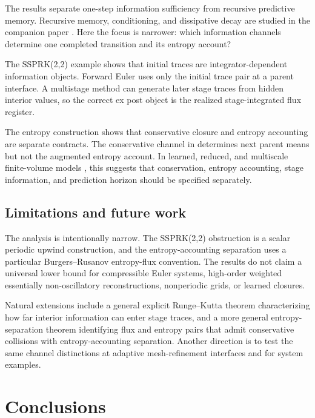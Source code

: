 \documentclass[a4paper,fleqn, sort&compress]{cas-sc}
\theoremstyle{remark}
\theoremstyle{definition}
\begin{document}
The results separate one-step information sufficiency from recursive
predictive memory.  Recursive memory, conditioning, and dissipative decay are
studied in the companion paper \cite{PolemitisChristakisDrikakis2026FVerasure}.
Here the focus is narrower: which information channels determine one
completed transition and its entropy account?

The SSPRK(2,2) example shows that initial traces are integrator-dependent
information objects.  Forward Euler uses only the initial trace pair at a
parent interface.  A multistage method can generate later stage traces from
hidden interior values, so the correct ex post object is the realized
stage-integrated flux register.

The entropy construction shows that conservative closure and entropy
accounting are separate contracts.  The conservative channel in
 determines next parent means but not the augmented
entropy account.  In learned, reduced, and multiscale finite-volume models
\cite{BarSinai:2019datadriven,KochkovEtAl2021,AgdesteinSanderse2025,
SanderseEtAl2025}, this suggests that conservation, entropy accounting,
stage information, and prediction horizon should be specified separately.

\subsection{Limitations and future work}
\label{sec:limitations}

The analysis is intentionally narrow.  The SSPRK(2,2) obstruction is a scalar
periodic upwind construction, and the entropy-accounting separation uses a
particular Burgers--Rusanov entropy-flux convention.  The results do not
claim a universal lower bound for compressible Euler systems, high-order
weighted essentially non-oscillatory reconstructions, nonperiodic grids, or
learned closures.

Natural extensions include a general explicit Runge--Kutta theorem
characterizing how far interior information can enter stage traces, and a
more general entropy-separation theorem identifying flux and entropy pairs
that admit conservative collisions with entropy-accounting separation.
Another direction is to test the same channel distinctions at adaptive
mesh-refinement interfaces and for system examples.

\section{Conclusions}
\label{sec:conclusions}
\end{document}
